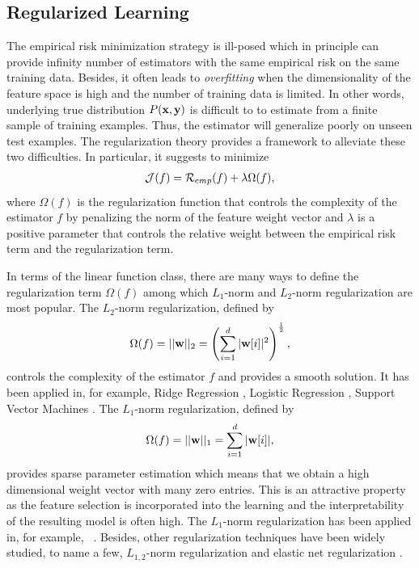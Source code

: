 \subsection{Regularized Learning}\label{sc_rl}

The empirical risk minimization strategy is ill-posed which in principle can provide infinity number of estimators with the same empirical risk on the same training data.
Besides, it often leads to \textit{overfitting} when the dimensionality of the feature space is high and the number of training data is limited.
In other words, underlying true distribution $P(\mathbf {x},\mathbf {y})$ is difficult to to estimate from a finite sample of training examples.
Thus, the estimator will generalize poorly on unseen test examples.
The {regularization theory} \citep{Evgeniou99a,Evgeniou02regularization} provides a framework to alleviate these two difficulties.
In particular, it suggests to minimize 
 \begin{align}
	\mathcal{J}(f) = \mathcal{R}_{emp}(f) + \lambda\Omega(f), \label{rl}
\end{align}
where $\Omega(f)$ is the regularization function that controls the complexity of the estimator $f$ by penalizing the norm of the feature weight vector and $\lambda$ is a positive parameter that controls the relative weight between the empirical risk term and the regularization term.

In terms of the linear function class, there are many ways to define the regularization term $\Omega(f)$ among which $L_1$-norm and $L_2$-norm regularization are most popular.
The $L_2$-norm regularization, defined by 
\begin{align*}
	\Omega(f) = ||\mathbf {w}||_2=\left(\sum_{i=1}^d|\mathbf {w}[i]|^2\right)^{\frac{1}{2}},
\end{align*} 
controls the complexity of the estimator $f$ and provides a smooth solution.
It has been applied in, for example, Ridge Regression \citep{Hoerl00ridge}, Logistic Regression \citep{Chen00}, Support Vector Machines \citep{Cortes95support}.
The $L_1$-norm regularization, defined by
\begin{align*}
	\Omega(f) = ||\mathbf {w}||_1=\sum_{i=1}^d|\mathbf {w}[i]|,
\end{align*}
provides sparse parameter estimation which means that we obtain a high dimensional weight vector with many zero entries.
This is an attractive property as the feature selection is incorporated into the learning and the interpretability of the resulting model is often high.
The $L_1$-norm regularization has been applied in, for example, \lasso\ \citep{Tibshirani94regression}.
Besides, other regularization techniques have been widely studied, to name a few, $L_{1,2}$-norm regularization \citep{Argyriou07multitask} and elastic net regularization \citep{Zou05regularizationa}.


